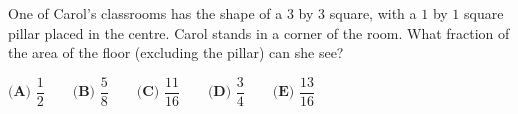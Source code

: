 One of Carol's classrooms has the shape of a $3$ by $3$ square, with a $1$ by $1$ square pillar placed in the centre. Carol stands in a corner of the room. What fraction of the area of the floor (excluding the pillar) can she see?

$\textbf{(A) } \dfrac{1}{2} \qquad \textbf{(B) } \dfrac{5}{8} \qquad \textbf{(C) } \dfrac{11}{16} \qquad \textbf{(D) } \dfrac{3}{4} \qquad \textbf{(E) } \dfrac{13}{16}$
